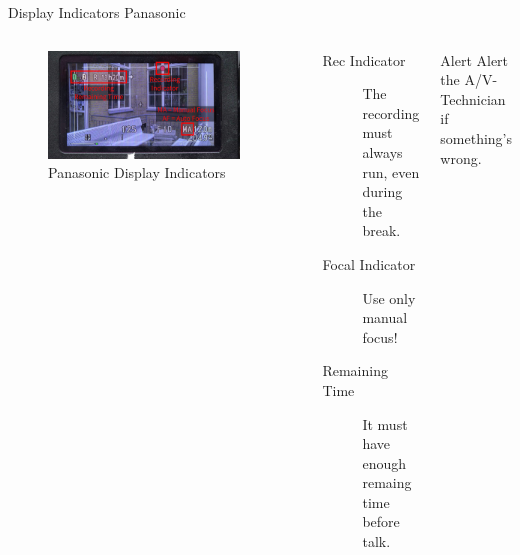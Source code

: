 \documentclass[aspectratio=169]{beamer}
\begin{document}
\begin{frame}{Display Indicators Panasonic}
	\begin{columns}[T,onlytextwidth]
	\begin{figure} 
		\centering
		\includegraphics[width=0.9\textwidth]{images/panasonic_display_description.png}
		\caption{Panasonic Display Indicators}
	\end{figure}
		\begin{description}
			\item[Rec Indicator] The recording must always run, even during the break.
			\item[Focal Indicator] Use only manual focus!
			\item[Remaining Time] It must have enough remaing time before talk.
		\end{description}
		\begin{alertblock}{Alert}
			Alert the A/V-Technician if something's wrong.
		\end{alertblock}
	\end{columns}
\end{frame}
\end{document}

